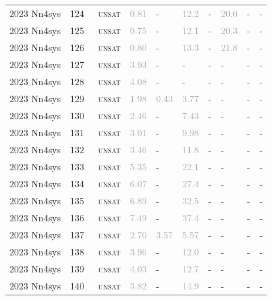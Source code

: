 \begin{center}
{\begin{longtable}{@{}llllllllll@{}}
2023 Nn4sys & 124 & ~\textsc{unsat} & \textcolor{darkgray}{0.81} & - & \textcolor{darkgray}{12.2} & - & \textcolor{darkgray}{20.0} & - & - \\
2023 Nn4sys & 125 & ~\textsc{unsat} & \textcolor{darkgray}{0.75} & - & \textcolor{darkgray}{12.1} & - & \textcolor{darkgray}{20.3} & - & - \\
2023 Nn4sys & 126 & ~\textsc{unsat} & \textcolor{darkgray}{0.80} & - & \textcolor{darkgray}{13.3} & - & \textcolor{darkgray}{21.8} & - & - \\
2023 Nn4sys & 127 & ~\textsc{unsat} & \textcolor{darkgray}{3.93} & - & - & - & - & - & - \\
2023 Nn4sys & 128 & ~\textsc{unsat} & \textcolor{darkgray}{4.08} & - & - & - & - & - & - \\
2023 Nn4sys & 129 & ~\textsc{unsat} & \textcolor{darkgray}{1.98} & \textcolor{darkgray}{0.43} & \textcolor{darkgray}{3.77} & - & - & - & - \\
2023 Nn4sys & 130 & ~\textsc{unsat} & \textcolor{darkgray}{2.46} & - & \textcolor{darkgray}{7.43} & - & - & - & - \\
2023 Nn4sys & 131 & ~\textsc{unsat} & \textcolor{darkgray}{3.01} & - & \textcolor{darkgray}{9.98} & - & - & - & - \\
2023 Nn4sys & 132 & ~\textsc{unsat} & \textcolor{darkgray}{3.46} & - & \textcolor{darkgray}{11.8} & - & - & - & - \\
2023 Nn4sys & 133 & ~\textsc{unsat} & \textcolor{darkgray}{5.35} & - & \textcolor{darkgray}{22.1} & - & - & - & - \\
2023 Nn4sys & 134 & ~\textsc{unsat} & \textcolor{darkgray}{6.07} & - & \textcolor{darkgray}{27.4} & - & - & - & - \\
2023 Nn4sys & 135 & ~\textsc{unsat} & \textcolor{darkgray}{6.89} & - & \textcolor{darkgray}{32.5} & - & - & - & - \\
2023 Nn4sys & 136 & ~\textsc{unsat} & \textcolor{darkgray}{7.49} & - & \textcolor{darkgray}{37.4} & - & - & - & - \\
2023 Nn4sys & 137 & ~\textsc{unsat} & \textcolor{darkgray}{2.70} & \textcolor{darkgray}{3.57} & \textcolor{darkgray}{5.57} & - & - & - & - \\
2023 Nn4sys & 138 & ~\textsc{unsat} & \textcolor{darkgray}{3.96} & - & \textcolor{darkgray}{12.0} & - & - & - & - \\
2023 Nn4sys & 139 & ~\textsc{unsat} & \textcolor{darkgray}{4.03} & - & \textcolor{darkgray}{12.7} & - & - & - & - \\
2023 Nn4sys & 140 & ~\textsc{unsat} & \textcolor{darkgray}{3.82} & - & \textcolor{darkgray}{14.9} & - & - & - & - \\

\end{longtable}}
\end{center}
